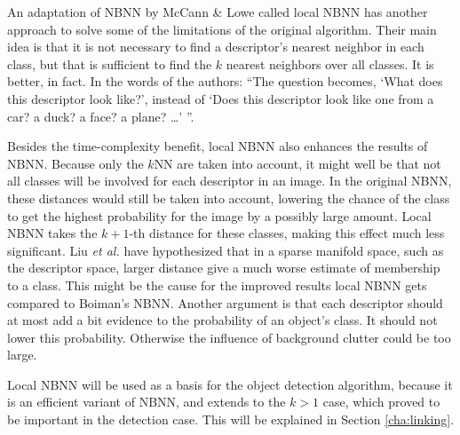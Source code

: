 An adaptation of NBNN by McCann \& Lowe called local NBNN\cite{mccann2012local} has another approach to solve some of the limitations of the original algorithm. Their main idea is that it is not necessary to find a descriptor's nearest neighbor in each class, but that is sufficient to find the $k$ nearest neighbors over all classes. It is better, in fact. In the words of the authors: ``The question becomes, `What does this descriptor look like?', instead of `Does this descriptor look like one from a car? a duck? a face? a plane? \ldots' ''. 

Besides the time-complexity benefit, local NBNN also enhances the results of NBNN. Because only the $k$NN are taken into account, it might well be that not all classes will be involved for each descriptor in an image. In the original NBNN, these distances would still be taken into account, lowering the chance of the class to get the highest probability for the image by a possibly large amount. Local NBNN takes the $k+1$-th distance for these classes, making this effect much less significant. Liu \emph{et al.}\cite{liu2011defense} have hypothesized that in a sparse manifold space, such as the descriptor space, larger distance give a much worse estimate of membership to a class. This might be the cause for the improved results local NBNN gets compared to Boiman's NBNN. Another argument is that each descriptor should at most add a bit evidence to the probability of an object's class. It should not lower this probability. Otherwise the influence of background clutter could be too large.

Local NBNN will be used as a basis for the object detection algorithm, because it is an efficient variant of NBNN, and extends to the $k>1$ case, which proved to be important in the detection case. This will be explained in Section \ref{cha:linking}.

\begin{figure}[hbt]
    \centering
\end{figure}



